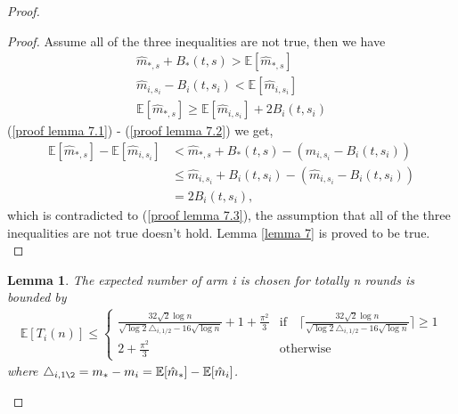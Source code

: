 \documentclass{article}
\theoremstyle{plain}
\newtheorem{lemma}{Lemma}
\begin{document}
\begin{proof}
\begin{proof}
Assume all of the three inequalities are not true, then we have
    \begin{align}
        \label{proof lemma 7.1}
         \hat{m}_{*, s} + B_*(t, s) >  \mathbb{E}[\hat{m}_{*, s}]\\
        \label{proof lemma 7.2}
        \hat{m}_{i, s_i} - B_i(t, s_i) < \mathbb{E}[\hat{m}_{i, s_i}]\\
        \label{proof lemma 7.3}
        \mathbb{E}[\hat{m}_{*, s}] \geq \mathbb{E}[\hat{m}_{i, s_i}] + 2 B_i(t, s_i)
    \end{align}
    (\ref{proof lemma 7.1}) - (\ref{proof lemma 7.2}) we get, 
    \begin{align}
         \mathbb{E}[\hat{m}_{*, s}] - \mathbb{E}[\hat{m}_{i, s_i}] &< 
         \hat{m}_{*, s} + B_*(t, s) - (\hat{m}_{i, s_i} - B_i(t, s_i)) \\
        & \leq \hat{m}_{i, s_i} + B_i(t, s_i) - (\hat{m}_{i, s_i} - B_i(t, s_i)) \\
        &= 2 B_i(t, s_i),
    \end{align}
    which is contradicted to (\ref{proof lemma 7.3}), the assumption that all of the three inequalities are not true doesn't hold. Lemma \ref{lemma 7} is proved to be true.\\
\end{proof}

\begin{lemma}
\label{Lemma 8: bound for E[T_i(n)]}
    The expected number of arm i is chosen for totally n rounds is bounded by 
    \begin{align}
        \mathbb{E}[T_i(n)] \leq  \begin{cases} 
           \frac{32 \sqrt{2} \log n}{\sqrt{\log 2} \triangle_{i, 1/2} - 16 \sqrt{\log n}} + 1 + \frac{\pi^2}{3} &  \text{if}  \quad \lceil\frac{32 \sqrt{2} \log n}{\sqrt{\log 2} \triangle_{i, 1/2} - 16 \sqrt{\log n}} \rceil \geq 1 \\
          2 + \frac{\pi^2}{3} & \text{otherwise} 
   \end{cases}
    \end{align}
    where $\triangle_{i, 1\2} = m_\ast - m_i = \mathbb{E}[\hat{m}_\ast] - \mathbb{E}[\hat{m}_i]$.
\end{lemma}


\end{proof}
\end{document}
